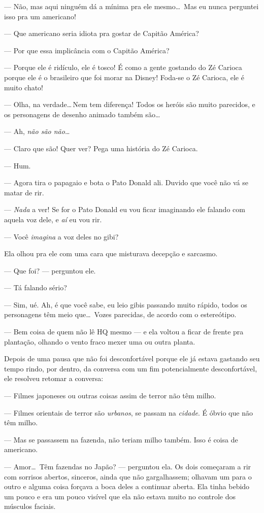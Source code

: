 --- Não, mas aqui ninguém dá a mínima pra ele mesmo\ldots \ Mas eu nunca perguntei isso pra um americano!

--- Que americano seria idiota pra gostar de Capitão América?

--- Por que essa implicância com o Capitão América?

--- Porque ele é ridículo, ele é tosco! É como a gente gostando do Zé Carioca porque ele é o brasileiro que foi morar na Disney! Foda-se o Zé Carioca, ele é muito chato!

--- Olha, na verdade\ldots\,Nem tem diferença! Todos os heróis são muito parecidos, e os personagens de desenho animado também são\ldots

--- Ah, \emph{não são não}\ldots

--- Claro que são! Quer ver? Pega uma história do Zé Carioca.

--- Hum.

--- Agora tira o papagaio e bota o Pato Donald ali. Duvido que você não vá se matar de rir.

--- \emph{Nada} a ver! Se for o Pato Donald eu vou ficar imaginando ele falando com aquela voz dele, e \emph{aí} eu vou rir.

--- Você \emph{imagina} a voz deles no gibi?

Ela olhou pra ele com uma cara que misturava decepção e sarcasmo.

--- Que foi? --- perguntou ele.

--- Tá falando sério?

--- Sim, ué. Ah, é que você sabe, eu leio gibis passando muito rápido, todos os personagens têm meio que\ldots \ Vozes parecidas, de acordo com o estereótipo.

--- Bem coisa de quem não lê HQ mesmo --- e ela voltou a ficar de frente pra plantação, olhando o vento fraco mexer uma ou outra planta.

Depois de uma pausa que não foi desconfortável porque ele já estava gastando seu tempo rindo, por dentro, da conversa com um fim potencialmente desconfortável, ele resolveu retomar a conversa:

--- Filmes japoneses ou outras coisas assim de terror não têm milho.

--- Filmes orientais de terror são \emph{urbanos}, se passam na \emph{cidade}. É óbvio que não têm milho.

--- Mas se passassem na fazenda, não teriam milho também. Isso é coisa de americano.

--- Amor\ldots \ Têm fazendas no Japão? --- perguntou ela. Os dois começaram a rir com sorrisos abertos, sinceros, ainda que não gargalhassem; olhavam um para o outro e alguma coisa forçava a boca deles a continuar aberta. Ela tinha bebido um pouco e era um pouco visível que ela não estava muito no controle dos músculos faciais.

